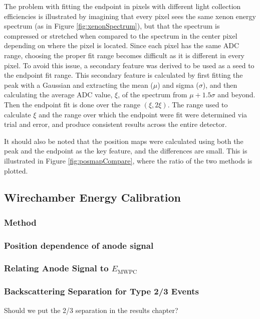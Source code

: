 The problem with fitting the endpoint in pixels with different light collection efficiencies is illustrated by
imagining that every pixel sees the same xenon energy spectrum (as in Figure \ref{fig:xenonSpectrum}), but that
the spectrum is compressed or stretched when compared to the spectrum in the center pixel depending on where
the pixel is located. Since each pixel has the same ADC range, choosing the proper fit range becomes difficult
as it is different in every pixel. To avoid this issue, a secondary feature was derived to be used as a
seed to the endpoint fit range. This secondary feature is calculated by first fitting the peak with a Gaussian
and extracting the mean ($\mu$) and sigma ($\sigma$), and then calculating the average ADC value, $\xi$, of the spectrum
from $\mu+1.5\sigma$ and beyond. Then the endpoint fit is done over the range $(\xi,2\xi)$. The range used to
calculate $\xi$ and the range over which the endpoint were fit were determined via trial and error, and produce
consistent results across the entire detector.

It should also be noted that the position maps were calculated using both the peak and the endpoint as the key
feature, and the differences are small. This is illustrated in Figure \ref{fig:posmapCompare}, where the
ratio of the two methods is plotted.



\subsection{Wirechamber Energy Calibration}

\subsubsection{Method}

\subsubsection{Position dependence of anode signal}

\subsubsection{Relating Anode Signal to $E_{\mathrm{MWPC}}$}

\subsubsection{Backscattering Separation for Type 2/3 Events} \label{sssec:backscSep}
Should we put the 2/3 separation in the results chapter?

